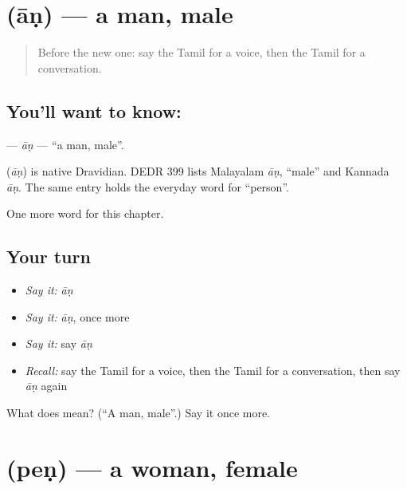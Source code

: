 \section[\texorpdfstring{\ta{ஆண்} (āṇ)}{ஆண் (āṇ)}]{ (āṇ) — a man, male}

\label{lesson:TA-C245-an}



\begin{quote}
Before the new one: say the Tamil for a voice, then the Tamil for a conversation.
\end{quote}

\subsection*{You'll want to know: }
\textbf{} — \emph{āṇ} — \textquotedblleft{}a man, male\textquotedblright{}.

\begin{cousinweb}
\textbf{} (\emph{āṇ}) is native Dravidian. DEDR 399 lists Malayalam \emph{āṇ}, \textquotedblleft{}male\textquotedblright{} and Kannada \emph{āṇ}. The same entry holds the everyday word for \textquotedblleft{}person\textquotedblright{}.
\end{cousinweb}

\begin{grammarlens}[title={What you've built}]
One more word for this chapter.
\end{grammarlens}

\subsection*{Your turn}
\begin{itemize}
\raggedright
  \item \emph{Say it:} \emph{āṇ}
  \item \emph{Say it:} \emph{āṇ}, once more
  \item \emph{Say it:} say \emph{āṇ}
  \item \emph{Recall:} say the Tamil for a voice, then the Tamil for a conversation, then say \emph{āṇ} again
\end{itemize}

\begin{tcolorbox}[breakable,colback=teal!4,colframe=teal!35!black,title={Before you move on}]
What does  mean? (\textquotedblleft{}A man, male\textquotedblright{}.) Say it once more.
\end{tcolorbox}
\section[\texorpdfstring{\ta{பெண்} (peṇ)}{பெண் (peṇ)}]{ (peṇ) — a woman, female}

